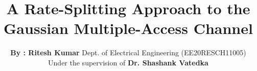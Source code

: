 \documentclass[10pt]{beamer}
\title[]{ A Rate-Splitting Approach to the Gaussian Multiple-Access Channel}
\author[Ritesh]{\textbf{By : Ritesh Kumar} \newline Dept. of Electrical Engineering \newline (EE20RESCH11005) \newline \newline Under the supervision of	\newline \textbf{Dr. Shashank Vatedka}}
\institute{IIT Hyderabad}
\date
\begin{document}
	\begin{frame}
		\titlepage
	\end{frame}
%			
	
\end{document}
